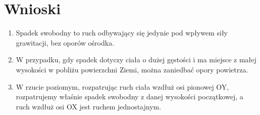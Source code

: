 \documentclass[12pt, a4paper]{article}
\begin{document}
\newpage

\section{Wnioski}

\vspace{1cm}

\begin{enumerate}[label=\alph*)]
    \item Spadek swobodny to ruch odbywający się jedynie pod wpływem siły grawitacji, bez oporów ośrodka.
    \item W przypadku, gdy spadek dotyczy ciała o dużej gęstości i ma miejsce z małej wysokości w pobliżu powierzchni Ziemi, można zaniedbać opory powietrza.
    \item W rzucie poziomym, rozpatrując ruch ciała wzdłuż osi pionowej OY, rozpatrujemy właśnie spadek swobodny z danej wysokości początkowej, a ruch wzdłuż osi OX jest ruchem jednostajnym.
\end{enumerate}
\end{document}
